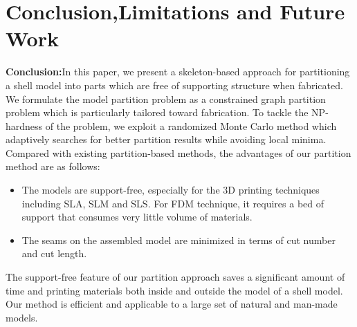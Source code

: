 \section{Conclusion,Limitations and Future Work}

\textbf{Conclusion:}In this paper, we present a skeleton-based approach for partitioning a shell model into parts which are free of supporting structure when fabricated. We formulate the model partition problem as a constrained graph partition problem which is particularly tailored toward fabrication. To tackle the NP-hardness of the problem, we exploit a randomized Monte Carlo method which adaptively searches for better partition results while avoiding local minima. Compared with existing partition-based methods, the advantages of our partition method are as follows:

\begin{itemize}
 \item The models are support-free, especially for the 3D printing techniques including SLA, SLM and SLS. For FDM technique, it requires a bed of support that consumes very little volume of materials.
\item The seams on the assembled model are minimized in terms of cut number and cut length.
\end{itemize}

The support-free feature of our partition approach saves a significant amount of time and printing materials both inside and outside the model of a shell model. Our method is efficient and applicable to a large set of natural and man-made models.

